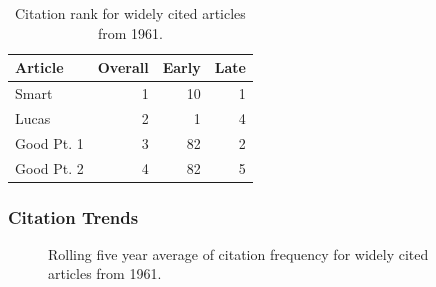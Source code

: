 \documentclass[
  10pt,
  letterpaper,
  DIV=11,
  numbers=noendperiod,
  twoside]{scrartcl}
\begin{document}
\begin{longtable}[]{@{}lrrr@{}}

\caption{\label{tbl-citation-rank-1961}Citation rank for widely cited
articles from 1961.}

\tabularnewline

\toprule\noalign{}
Article & Overall & Early & Late \\
\midrule\noalign{}
\endhead
\bottomrule\noalign{}
\endlastfoot
Smart & 1 & 10 & 1 \\
Lucas & 2 & 1 & 4 \\
Good Pt. 1 & 3 & 82 & 2 \\
Good Pt. 2 & 4 & 82 & 5 \\

\end{longtable}

\subsubsection*{Citation Trends}\label{sec-trends-1961}

\begin{figure}


\caption{\label{fig-citation-spaghetti-1961}Rolling five year average of
citation frequency for widely cited articles from 1961.}

\end{figure}%
\end{document}
